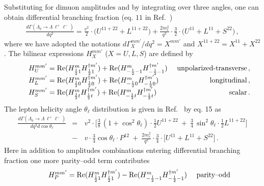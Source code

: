Substituting for dimuon amplitudes and by integrating over three angles, one can obtain differential branching fraction (eq. $11$ in
Ref.~\cite{Gutsche:2013pp})
\begin{eqnarray}
\label{bjoint00}
\frac{d\Gamma(\Lambda_b \to \Lambda \,\ell^{+}\ell^{-})}{d q^2}=
\frac{v^{2}}{2}\cdot\bigg( U^{11+22} + L^{11+22} \bigg)
+\frac{2m_\ell^{2}}{q^{2}}\cdot\frac{3}{2}\cdot
\bigg( U^{11} + L^{11} + S^{22} \bigg)\,, 
\end{eqnarray}
where we have adopted the notations
$d\Gamma_X^{mm'}/d q^2=X^{mm'}$ and $X^{11+22}=X^{11}+X^{22}$.
The bilinear expressions $H^{mm'}_{X}$ ($X=U,L,S$) are defined by
\begin{equation}
\label{helcom2}
\qquad
\begin{array}{lr}
\mbox{$ H^{mm'}_U = 
{\rm Re}(H^{m}_{\frac{1}{2}1} H^{\dagger m'}_{\frac{1}{2}1}) + 
{\rm Re}(H^{m}_{-\frac{1}{2}-1} H^{\dagger m'}_{-\frac{1}{2}-1}) $}  & 
\hfill\mbox{ \rm unpolarized-transverse}\,, 
\\
\mbox{$ H^{mm'}_L = 
{\rm Re}(H^{m}_{\frac{1}{2}0} H^{\dagger m'}_{\frac{1}{2}0}) + 
{\rm Re}(H^{m}_{-\frac{1}{2}0} H^{\dagger m'}_{-\frac{1}{2}0}) $}     & 
\hfill\mbox{ \rm longitudinal}\,, 
\\
\mbox{$ H^{mm'}_S =  
{\rm Re}(H^{m}_{\frac{1}{2}t}H^{\dagger m'}_{\frac{1}{2}t}) +  
{\rm Re}(H^{m}_{-\frac{1}{2}t}H^{\dagger m'}_{-\frac{1}{2}t})$} &  
\hfill\mbox{ \rm scalar}\,. 
\end{array}\\
\end{equation}
The lepton helicity angle $\theta_\ell$ distribution is given in Ref.~\cite{Gutsche:2013pp} by eq. 15
as
\begin{eqnarray}
\label{costheta2}
\frac{d\Gamma(\Lambda_{b}\to \Lambda \,\ell^{+}\ell^{-})}{dq^2d\cos\theta_\ell} 
&=&\,
v^{2}\cdot\bigg[\frac{3}{8}\,(1+\cos^2\theta_\ell)\cdot
\frac{1}{2} U^{11+22}  
\ + \ \frac{3}{4}\,\sin^2\theta_\ell\cdot
\frac{1}{2} L^{11+22} \bigg]\label{distr2}\nonumber\\[2mm]
&-&\,v \cdot\frac{3}{4}\cos\theta_\ell\cdot P^{12} 
\ + \ \frac{2m_{\ell}^{2}}{q^{2}}\cdot \frac{3}{4}\cdot
\bigg[ U^{11}+ L^{11} + S^{22} \bigg]\,.
\end{eqnarray}
Here in addition to amplitudes combinations entering differential branching fraction one more
parity--odd term contributes
\begin{equation}
\label{helcom2a}
\qquad\begin{array}{lr}
\mbox{$H^{mm'}_P =  
{\rm Re}(H^{m}_{\frac{1}{2}1}H^{\dagger m'}_{\frac{1}{2}1})- 
{\rm Re}(H^{m}_{-\frac{1}{2}-1}H^{\dagger m'}_{-\frac{1}{2}-1})$} & 
\hfill\mbox{ \rm parity--odd}
\\
\end{array}\\
\end{equation}

